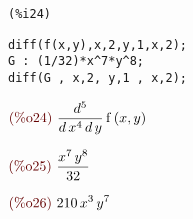 \documentclass{article}
\begin{document}
\noindent
\begin{minipage}[t]{8ex}{\color{red}\bf
\begin{verbatim}
(%i24) 
\end{verbatim}}
\end{minipage}
\begin{minipage}[t]{\textwidth}{\color{blue}
\begin{verbatim}
diff(f(x,y),x,2,y,1,x,2);
G : (1/32)*x^7*y^8;
diff(G , x,2, y,1 , x,2);
\end{verbatim}}
\end{minipage}
\begin{math}\displaystyle
\parbox{8ex}{\color{labelcolor}(\%o24) }
\frac{{d}^{5}}{d\,{x}^{4}\,d\,y}\,\mathrm{f}\left( x,y\right) 
\end{math}

\begin{math}\displaystyle
\parbox{8ex}{\color{labelcolor}(\%o25) }
\frac{{x}^{7}\,{y}^{8}}{32}
\end{math}

\begin{math}\displaystyle
\parbox{8ex}{\color{labelcolor}(\%o26) }
210\,{x}^{3}\,{y}^{7}
\end{math}
\end{document}
